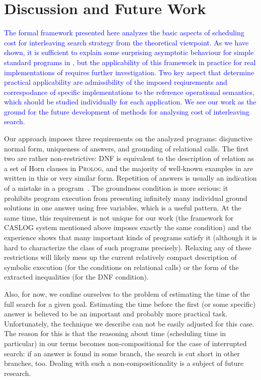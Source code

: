\section{Discussion and Future Work}
\label{sec:discussion}

\textcolor{blue}{
The formal framework presented here analyzes the basic aspects of scheduling cost for interleaving search strategy from the theoretical viewpoint.
As we have shown, it is sufficient to explain some surprising asymptotic behaviour for simple standard programs in \mK,
but the applicability of this framework in practice for real implementations of \mK requires further investigation.
Two key aspect that determine practical applicability are admissibility of the imposed reqiurements and correspodance of specific \mK implementations to the reference operational semantics, which should be studied individually for each application.
We see our work as the ground for the future development of methods for analysing cost of interleaving search.
}

Our approach imposes three requirements on the analyzed programs: disjunctive normal form, uniqueness of answers, and grounding of relational calls.
The first two are rather non-restrictive: DNF is equivalent to the description of relation as a set of Horn clauses in \textsc{Prolog},
and the majority of well-known examples in \mK are written in this or very similar form. Repetition of answers is usually an indication
of a mistake in a program~\cite{WillsThesis}. The groundness condition is more serious: it prohibits program execution from presenting infinitely
many individual ground solutions in one answer using free variables, which is a useful pattern. At the same time, this requirement is
not unique for our work (the framework for \textsc{CASLOG} system mentioned above imposes exactly the same condition) and the experience
shows that many important kinds of programs satisfy it (although it is hard to characterize the class of such programs precisely).
Relaxing any of these restrictions will likely mess up the current relatively compact description of symbolic execution (for
the conditions on relational calls) or the form of the extracted inequalities (for the DNF condition).

Also, for now, we confine ourselves to the problem of estimating the time of the full search for a given goal. Estimating the time before
the first (or some specific) answer is believed to be an important and probably more practical task. Unfortunately, the technique we describe
can not be easily adjusted for this case. The reason for this is that the reasoning about time (scheduling time in particular) in our
terms becomes non-compositional for the case of interrupted search: if an answer is found in some branch, the search is cut short in
other branches, too. Dealing with such a non-compositionality is a subject of future research.

